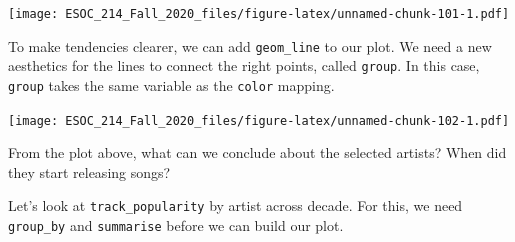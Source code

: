 \documentclass[
]{book}
\newenvironment{Shaded}{\begin{snugshade}}{\end{snugshade}}
\newcommand{\DataTypeTok}[1]{\textcolor[rgb]{0.13,0.29,0.53}{#1}}
\newcommand{\KeywordTok}[1]{\textcolor[rgb]{0.13,0.29,0.53}{\textbf{#1}}}
\newcommand{\NormalTok}[1]{#1}
\newcommand{\OperatorTok}[1]{\textcolor[rgb]{0.81,0.36,0.00}{\textbf{#1}}}
\newcommand{\StringTok}[1]{\textcolor[rgb]{0.31,0.60,0.02}{#1}}
\begin{document}
\begin{Shaded}
\end{Shaded}

\texttt{[image: ESOC\_214\_Fall\_2020\_files/figure-latex/unnamed-chunk-101-1.pdf]}

To make tendencies clearer, we can add \texttt{geom\_line} to our plot. We need a new aesthetics for the lines to connect the right points, called \texttt{group}. In this case, \texttt{group} takes the same variable as the \texttt{color} mapping.

\begin{Shaded}
\end{Shaded}

\texttt{[image: ESOC\_214\_Fall\_2020\_files/figure-latex/unnamed-chunk-102-1.pdf]}

From the plot above, what can we conclude about the selected artists? When did they start releasing songs?

Let's look at \texttt{track\_popularity} by artist across decade. For this, we need \texttt{group\_by} and \texttt{summarise} before we can build our plot.

\begin{Shaded}
\end{Shaded}
\end{document}
